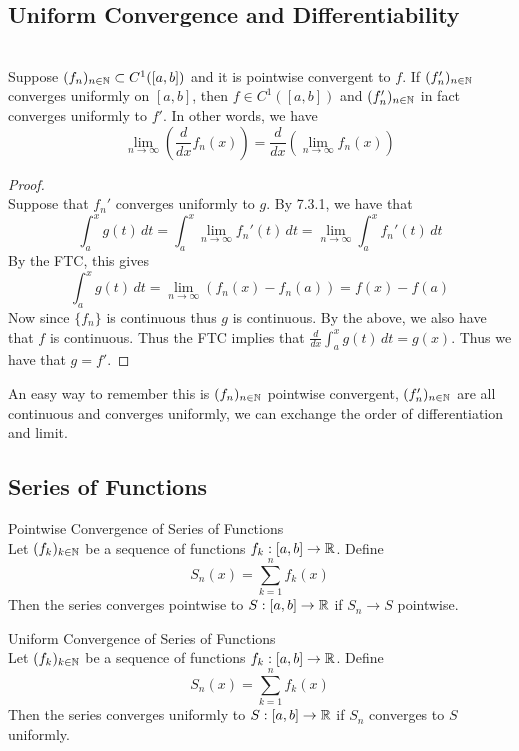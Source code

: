 \documentclass[a4paper]{article}
\begin{document}
\subsection{Uniform Convergence and Differentiability}
\begin{thm}{}{}\\ Suppose $(f_n)_{n\in\mathbb{N}}\subset C^1([a,b])$ and it is pointwise convergent to $f$. If $(f_n')_{n\in\mathbb{N}}$ converges uniformly on $[a,b]$, then $f\in C^1([a,b])$ and $(f_n')_{n\in\mathbb{N}}$ in fact converges uniformly to $f'$. In other words, we have $$\lim_{n\to\infty}\left(\frac{d}{dx}f_n(x)\right)=\frac{d}{dx}\left(\lim_{n\to\infty}f_n(x)\right)$$ 
\begin{proof}\\ Suppose that $f_n'$ converges uniformly to $g$. By 7.3.1, we have that $$\int_a^xg(t)\,dt=\int_a^x\lim_{n\to\infty}f_n'(t)\,dt=\lim_{n\to\infty}\int_a^xf_n'(t)\,dt$$
By the FTC, this gives $$\int_a^xg(t)\,dt=\lim_{n\to\infty}(f_n(x)-f_n(a))=f(x)-f(a)$$
Now since $\{f_n\}$ is continuous thus $g$ is continuous. By the above, we also have that $f$ is continuous. Thus the FTC implies that $\frac{d}{dx}\int_a^xg(t)\,dt=g(x)$. Thus we have that $g=f'$. 
\end{proof}
\end{thm}

An easy way to remember this is $(f_n)_{n\in\mathbb{N}}$ pointwise convergent, $(f_n')_{n\in\mathbb{N}}$ are all continuous and converges uniformly, we can exchange the order of differentiation and limit. 

\subsection{Series of Functions}
\begin{defn}{Pointwise Convergence of Series of Functions}{}\\ Let $(f_k)_{k\in\mathbb{N}}$ be a sequence of functions $f_k:[a,b]\to\mathbb{R}$. Define $$S_n(x)=\sum_{k=1}^nf_k(x)$$ Then the series converges pointwise to $S:[a,b]\to\mathbb{R}$ if $S_n\to S$ pointwise. 
\end{defn}

\begin{defn}{Uniform Convergence of Series of Functions}{}\\ Let $(f_k)_{k\in\mathbb{N}}$ be a sequence of functions $f_k:[a,b]\to\mathbb{R}$. Define $$S_n(x)=\sum_{k=1}^nf_k(x)$$ Then the series converges uniformly to $S:[a,b]\to\mathbb{R}$ if $S_n$ converges to $S$ uniformly.  
\end{defn}
\end{document}
